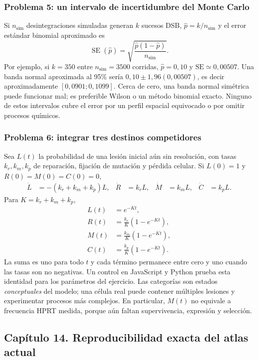 \documentclass[11pt,a4paper,oneside]{article}
\begin{document}
\subsubsection{Problema 5: un intervalo de incertidumbre del Monte Carlo}
Si $n_\mathrm{sim}$ desintegraciones simuladas generan $k$ sucesos DSB,
$\widehat p=k/n_\mathrm{sim}$ y el error estándar binomial aproximado es
\[
\operatorname{SE}(\widehat p)=
\sqrt{\frac{\widehat p(1-\widehat p)}{n_\mathrm{sim}}}.
\]
Por ejemplo, si $k=350$ entre $n_\mathrm{sim}=3500$ corridas,
$\widehat p=0,10$ y $\mathrm{SE}\simeq0,00507$.
Una banda normal aproximada al 95\% sería $0,10\pm1,96(0,00507)$,
es decir aproximadamente $[0,0901;0,1099]$. Cerca de cero, una banda
normal simétrica puede funcionar mal; es preferible Wilson o un método
binomial exacto. Ninguno de estos intervalos cubre el error por un perfil
espacial equivocado o por omitir procesos químicos.

\subsubsection{Problema 6: integrar tres destinos competidores}
Sea $L(t)$ la probabilidad de una lesión inicial aún sin resolución,
con tasas $k_r,k_m,k_p$ de reparación, fijación de mutación y pérdida
celular. Si $L(0)=1$ y $R(0)=M(0)=C(0)=0$,
\begin{align}
\dot L&=-(k_r+k_m+k_p)L,&
\dot R&=k_rL,&\dot M&=k_mL,&\dot C&=k_pL.
\end{align}
Para $K=k_r+k_m+k_p$,
\begin{align}
L(t)&=e^{-Kt},\\
R(t)&=\frac{k_r}{K}(1-e^{-Kt}),\\
M(t)&=\frac{k_m}{K}(1-e^{-Kt}),\\
C(t)&=\frac{k_p}{K}(1-e^{-Kt}).
\end{align}
La suma es uno para todo $t$ y cada término permanece entre cero y uno
cuando las tasas son no negativas. Un control en JavaScript y Python prueba
esta identidad para los parámetros del ejercicio. Las categorías son
estados \emph{conceptuales} del modelo; una célula real puede contener
múltiples lesiones y experimentar procesos más complejos. En particular,
$M(t)$ no equivale a frecuencia HPRT medida, porque aún faltan supervivencia,
expresión y selección.

\clearpage
\subsection{Capítulo 14. Reproducibilidad exacta del atlas actual}
\label{ampliacion-software}
\end{document}

